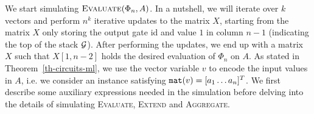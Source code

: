 
\medskip
We start simulating $\textsc{Evaluate}(\Phi_n,A)$. In a nutshell, we will iterate over $k$ vectors and perform
$n^k$ iterative updates to the matrix $X$, starting from the matrix $X$ only storing the output gate id and value $1$ in column $n-1$
(indicating the top of the stack $\mathcal{G}$). After performing the updates, we end up with a matrix $X$ such that $X[1,n-2]$ holds the desired
evaluation of $\Phi_n$ on $A$. As stated in Theorem~\ref{th-circuits-ml}, we use the vector variable $v$ to encode the input values in $A$, i.e. we consider
an instance satisfying $\texttt{mat}(v) = [a_1 \ldots a_n]^T$.  We first describe
some auxiliary \langfor expressions needed in the simulation before delving into the details of simulating \textsc{Evaluate}, \textsc{Extend} and \textsc{Aggregate}.

